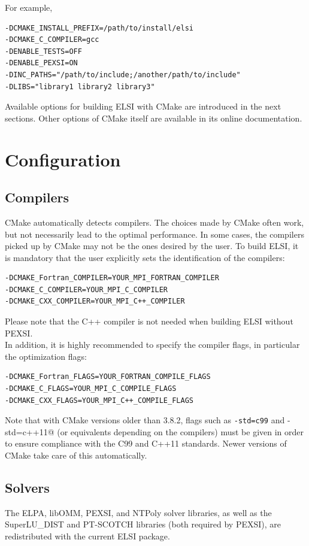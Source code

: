 \documentclass{report}
\begin{document}
For example,
\begin{verbatim}
-DCMAKE_INSTALL_PREFIX=/path/to/install/elsi
-DCMAKE_C_COMPILER=gcc
-DENABLE_TESTS=OFF
-DENABLE_PEXSI=ON
-DINC_PATHS="/path/to/include;/another/path/to/include"
-DLIBS="library1 library2 library3"
\end{verbatim}

Available options for building ELSI with CMake are introduced in the next sections.  Other options of CMake itself are available in its online documentation.\\

\section{Configuration}
\label{sec:config}
\subsection{Compilers}
\label{subsec:config_compilers}
CMake automatically detects compilers.  The choices made by CMake often work, but not necessarily lead to the optimal performance.  In some cases, the compilers picked up by CMake may not be the ones desired by the user.  To build ELSI, it is mandatory that the user explicitly sets the identification of the compilers:
\begin{verbatim}
-DCMAKE_Fortran_COMPILER=YOUR_MPI_FORTRAN_COMPILER
-DCMAKE_C_COMPILER=YOUR_MPI_C_COMPILER
-DCMAKE_CXX_COMPILER=YOUR_MPI_C++_COMPILER
\end{verbatim}

Please note that the C++ compiler is not needed when building ELSI without PEXSI.\\

In addition, it is highly recommended to specify the compiler flags, in particular the optimization flags:
\begin{verbatim}
-DCMAKE_Fortran_FLAGS=YOUR_FORTRAN_COMPILE_FLAGS
-DCMAKE_C_FLAGS=YOUR_MPI_C_COMPILE_FLAGS
-DCMAKE_CXX_FLAGS=YOUR_MPI_C++_COMPILE_FLAGS
\end{verbatim}

Note that with CMake versions older than 3.8.2, flags such as \verb+-std=c99+ and \verb@-std=c++11@ (or equivalents depending on the compilers) must be given in order to ensure compliance with the C99 and C++11 standards.  Newer versions of CMake take care of this automatically.\\

\subsection{Solvers}
\label{subsec:config_solvers}
The ELPA, libOMM, PEXSI, and NTPoly solver libraries, as well as the SuperLU\_DIST and PT-SCOTCH libraries (both required by PEXSI), are redistributed with the current ELSI package.\\
\end{document}
